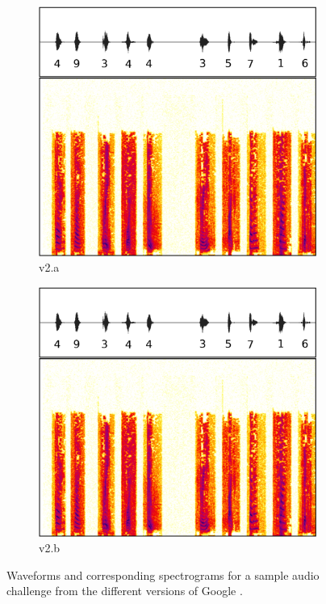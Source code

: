\begin{figure}[tp]
\begin{subfigure}{0.3\textwidth}
        \includegraphics[width=\textwidth]{figures/recaptcha2a.pdf}
        \caption{\re v2.a}
        \label{fig:recaptcha2a}
\end{subfigure}\hspace{0.03\textwidth}
\begin{subfigure}{0.3\textwidth}
        \includegraphics[width=\textwidth]{figures/recaptcha2a.pdf}
        \caption{\re v2.b}
        \label{fig:recaptcha2b}
\end{subfigure}
\caption{Waveforms and corresponding spectrograms for a sample audio challenge from the different versions of Google \re.}
\label{fig:examples}
\end{figure}

